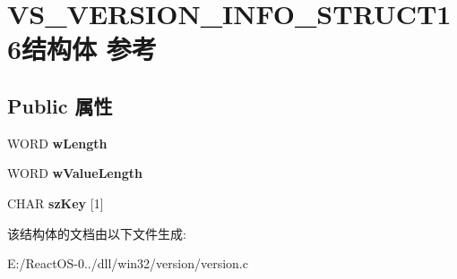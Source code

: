 \hypertarget{struct_v_s___v_e_r_s_i_o_n___i_n_f_o___s_t_r_u_c_t16}{}\section{V\+S\+\_\+\+V\+E\+R\+S\+I\+O\+N\+\_\+\+I\+N\+F\+O\+\_\+\+S\+T\+R\+U\+C\+T16结构体 参考}
\label{struct_v_s___v_e_r_s_i_o_n___i_n_f_o___s_t_r_u_c_t16}
\subsection*{Public 属性}
\begin{DoxyCompactItemize}
\item 
\mbox{\label{struct_v_s___v_e_r_s_i_o_n___i_n_f_o___s_t_r_u_c_t16_a327c7b7e0a45e5dd65b5f16b6fa33d3e}} 
W\+O\+RD {\bfseries w\+Length}
\item 
\mbox{\label{struct_v_s___v_e_r_s_i_o_n___i_n_f_o___s_t_r_u_c_t16_a1802f578abe6509569e4ffcc546b485c}} 
W\+O\+RD {\bfseries w\+Value\+Length}
\item 
\mbox{\label{struct_v_s___v_e_r_s_i_o_n___i_n_f_o___s_t_r_u_c_t16_a68d2d0d50e8ccd6cd3ec2c290233e595}} 
C\+H\+AR {\bfseries sz\+Key} \mbox{[}1\mbox{]}
\end{DoxyCompactItemize}


该结构体的文档由以下文件生成\+:\begin{DoxyCompactItemize}
\item 
E\+:/\+React\+O\+S-\/0../dll/win32/version/version.\+c\end{DoxyCompactItemize}
